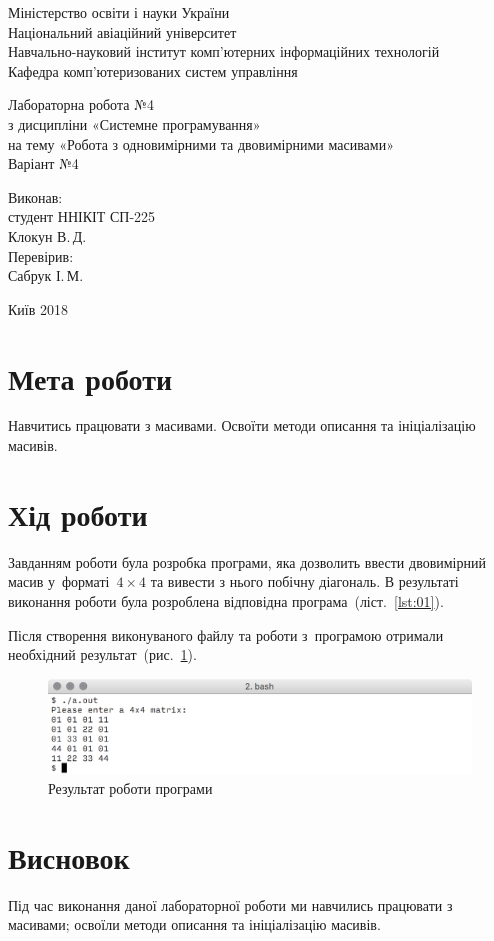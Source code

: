 \documentclass[a4paper,oneside,DIV=12,12pt,headings=normal]{scrartcl}
\begin{document}
	\begin{titlepage}
	\centering
		Міністерство освіти і науки України\\
		Національний авіаційний університет\\
		Навчально-науковий інститут комп'ютерних інформаційних технологій\\
		Кафедра комп'ютеризованих систем управління

		\vspace*{\fill}

		Лабораторна робота №4\\
		з дисципліни «Системне програмування»\\
		на тему «Робота з одновимірними та двовимірними масивами»\\
		Варіант №4

		\vspace*{\fill}
		
		\begin{flushright}
			Виконав:\\
			студент ННІКІТ СП-225\\
			Клокун В.\,Д.\\
			Перевірив:\\
			Сабрук І.\,М.
		\end{flushright}

		Київ 2018
    \end{titlepage}
	
	\section{Мета роботи}
		Навчитись працювати з масивами. Освоїти методи описання та ініціалізацію масивів.
		
	\section{Хід роботи}
		Завданням роботи була розробка програми, яка дозволить ввести двовимірний масив у~форматі~$4 \times 4$ та вивести з нього побічну діагональ. В результаті виконання роботи була розроблена відповідна програма~(ліст.~\ref{lst:01}).
		
		Після створення виконуваного файлу та роботи з~програмою отримали необхідний результат~(рис.~\ref{fig:program-result-screenshot}).
		
		\begin{figure}[!htbp]
		\centering
			\includegraphics[width = \linewidth]{./assets/y02s02-sysprog-lab-04-programres.png}
		\caption{Результат роботи програми}
		\label{fig:program-result-screenshot}
		\end{figure}
		
	\section{Висновок}
		Під час виконання даної лабораторної роботи ми навчились працювати з масивами; освоїли методи описання та ініціалізацію масивів.
\end{document}
